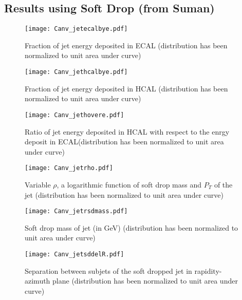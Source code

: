 \subsection{Results using Soft Drop (from Suman)}
\begin{figure}[H]
    \begin{center}
        \texttt{[image: Canv\_jetecalbye.pdf]}
        \caption{Fraction of jet energy deposited in ECAL (distribution has been normalized to unit area under curve)}
    \end{center}
\end{figure}
\begin{figure}[H]
    \begin{center}
        \texttt{[image: Canv\_jethcalbye.pdf]}
        \caption{Fraction of jet energy deposited in HCAL (distribution has been normalized to unit area under curve)}
    \end{center}
\end{figure}
\begin{figure}[H]
    \begin{center}
        \texttt{[image: Canv\_jethovere.pdf]}
        \caption{Ratio of jet energy deposited in HCAL with respect to the enrgy deposit in ECAL(distribution has been normalized to unit area under curve)}
    \end{center}
\end{figure}
\begin{figure}[H]
    \begin{center}
        \texttt{[image: Canv\_jetrho.pdf]}
        \caption{Variable $\rho$, a logarithmic function of soft drop mass and $P_{T}$ of the jet (distribution has been normalized to unit area under curve)}
    \end{center}
\end{figure}
\begin{figure}[H]
    \begin{center}
        \texttt{[image: Canv\_jetrsdmass.pdf]}
        \caption{Soft drop mass of jet (in GeV) (distribution has been normalized to unit area under curve)}
    \end{center}
\end{figure}
\begin{figure}[H]
    \begin{center}
        \texttt{[image: Canv\_jetsddelR.pdf]}
        \caption{Separation between subjets of the soft dropped jet in rapidity-azimuth plane (distribution has been normalized to unit area under curve)}
    \end{center}
\end{figure}
